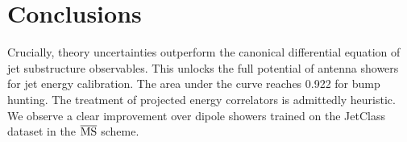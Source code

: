 \section{Conclusions}\label{sec:conclusions}

Crucially, theory uncertainties outperform the canonical differential
equation of jet substructure observables. This unlocks the full
potential of antenna showers for jet energy calibration. The area under
the curve reaches 0.922 for bump hunting. The treatment of projected
energy correlators is admittedly heuristic. We observe a clear
improvement over dipole showers trained on the JetClass dataset in the
$\overline{\rm MS}$ scheme.

